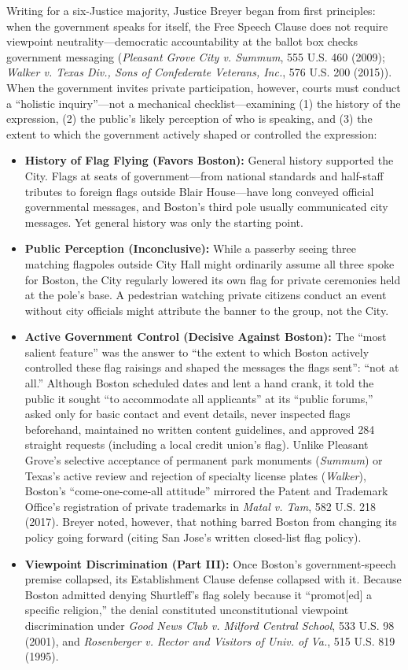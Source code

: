 \documentclass[12pt]{article}
\begin{document}
Writing for a six-Justice majority, Justice Breyer began from first principles: when the government speaks for itself, the Free Speech Clause does not require viewpoint neutrality---democratic accountability at the ballot box checks government messaging (\textit{Pleasant Grove City v. Summum}, 555 U.S. 460 (2009); \textit{Walker v. Texas Div., Sons of Confederate Veterans, Inc.}, 576 U.S. 200 (2015)). When the government invites private participation, however, courts must conduct a ``holistic inquiry''---not a mechanical checklist---examining (1) the history of the expression, (2) the public's likely perception of who is speaking, and (3) the extent to which the government actively shaped or controlled the expression:
\begin{itemize}
  \item \textbf{History of Flag Flying (Favors Boston):} General history supported the City. Flags at seats of government---from national standards and half-staff tributes to foreign flags outside Blair House---have long conveyed official governmental messages, and Boston's third pole usually communicated city messages. Yet general history was only the starting point.
  \item \textbf{Public Perception (Inconclusive):} While a passerby seeing three matching flagpoles outside City Hall might ordinarily assume all three spoke for Boston, the City regularly lowered its own flag for private ceremonies held at the pole's base. A pedestrian watching private citizens conduct an event without city officials might attribute the banner to the group, not the City.
  \item \textbf{Active Government Control (Decisive Against Boston):} The ``most salient feature'' was the answer to ``the extent to which Boston actively controlled these flag raisings and shaped the messages the flags sent'': ``not at all.'' Although Boston scheduled dates and lent a hand crank, it told the public it sought ``to accommodate all applicants'' at its ``public forums,'' asked only for basic contact and event details, never inspected flags beforehand, maintained no written content guidelines, and approved 284 straight requests (including a local credit union's flag). Unlike Pleasant Grove's selective acceptance of permanent park monuments (\textit{Summum}) or Texas's active review and rejection of specialty license plates (\textit{Walker}), Boston's ``come-one-come-all attitude'' mirrored the Patent and Trademark Office's registration of private trademarks in \textit{Matal v. Tam}, 582 U.S. 218 (2017). Breyer noted, however, that nothing barred Boston from changing its policy going forward (citing San Jose's written closed-list flag policy).
  \item \textbf{Viewpoint Discrimination (Part III):} Once Boston's government-speech premise collapsed, its Establishment Clause defense collapsed with it. Because Boston admitted denying Shurtleff's flag solely because it ``promot[ed] a specific religion,'' the denial constituted unconstitutional viewpoint discrimination under \textit{Good News Club v. Milford Central School}, 533 U.S. 98 (2001), and \textit{Rosenberger v. Rector and Visitors of Univ. of Va.}, 515 U.S. 819 (1995).
\end{itemize}
\end{document}

